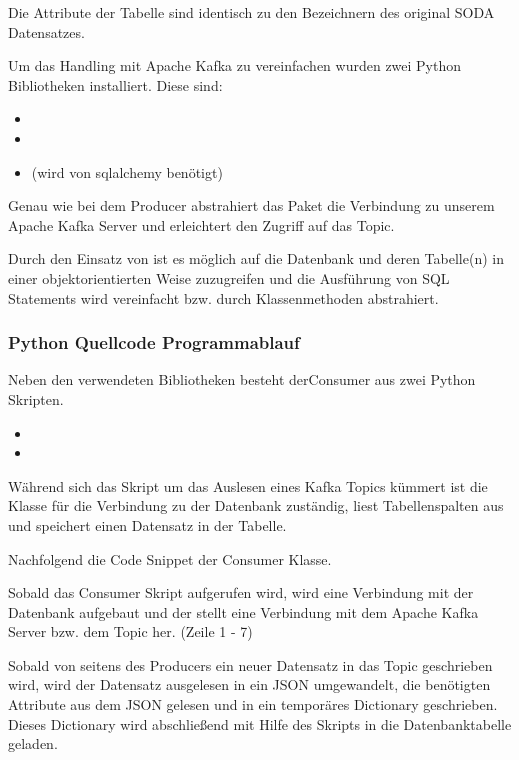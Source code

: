 Die Attribute der Tabelle  sind identisch zu den
Bezeichnern des original \ac{SODA} Datensatzes.

Um das Handling mit Apache Kafka zu vereinfachen wurden zwei Python
Bibliotheken installiert.
Diese sind:

\begin{itemize}
  \item {}
  \item {}
  \item {} (wird von sqlalchemy benötigt)
\end{itemize}

Genau wie bei dem Producer abstrahiert das Paket  die Verbindung zu unserem Apache Kafka Server und erleichtert den Zugriff auf das Topic.

Durch den Einsatz von  ist es möglich auf die Datenbank und deren Tabelle(n) in einer objektorientierten Weise zuzugreifen
und die Ausführung von \ac{SQL} Statements wird vereinfacht bzw. durch Klassenmethoden abstrahiert.

\subsubsection{Python Quellcode Programmablauf}
\label{subsub:quellcode_storage}
Neben den verwendeten Bibliotheken besteht derConsumer aus zwei Python Skripten.

\begin{itemize}
  \item {}
  \item {}
\end{itemize}

Während sich das  Skript um das Auslesen eines Kafka Topics kümmert ist die  Klasse
für die Verbindung zu der Datenbank zuständig, liest Tabellenspalten aus und speichert einen Datensatz in der Tabelle.

Nachfolgend die Code Snippet der Consumer Klasse.



Sobald das Consumer Skript aufgerufen wird, wird eine Verbindung mit der Datenbank
aufgebaut und der  stellt eine Verbindung mit dem Apache Kafka
Server bzw. dem Topic  her.
(Zeile 1 - 7)

Sobald von seitens des Producers ein neuer Datensatz in das Topic  geschrieben wird,
wird der Datensatz ausgelesen in ein \ac{JSON} umgewandelt, die benötigten Attribute aus dem \ac{JSON} gelesen
und in ein temporäres Dictionary geschrieben.\\
Dieses Dictionary wird abschließend mit Hilfe des  Skripts in die
Datenbanktabelle geladen.

